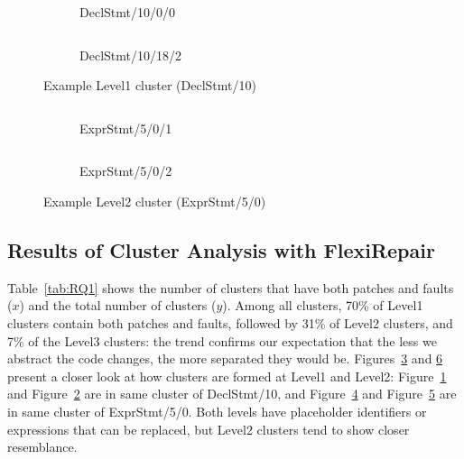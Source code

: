 \documentclass[conference]{IEEEtran}
\begin{document}
\begin{figure}[!ht]
    \begin{subfigure}{\linewidth}
        \centering
        \inputminted[escapeinside=||]{diff}{figures/diff/level1_a.diff}
        \caption{DeclStmt/10/0/0}
        \label{fig:RQ1_example_level1_a}
    \end{subfigure}
    \begin{subfigure}{\linewidth}
        \centering
        \inputminted[escapeinside=||]{diff}{figures/diff/level1_b.diff}
        \caption{DeclStmt/10/18/2}
        \label{fig:RQ1_example_level1_b}
    \end{subfigure}

    \caption{Example Level1 cluster (DeclStmt/10)}
    \label{fig:RQ1_example_level1}
\end{figure}

\begin{figure}[!ht]
    \begin{subfigure}{\linewidth}
        \centering
        \inputminted[escapeinside=||]{diff}{figures/diff/level2_a.diff}
        \caption{ExprStmt/5/0/1}
        \label{fig:RQ1_example_level2_a}
    \end{subfigure}
    \begin{subfigure}{\linewidth}
        \centering
        \inputminted[escapeinside=||]{diff}{figures/diff/level2_b.diff}
        \caption{ExprStmt/5/0/2}
        \label{fig:RQ1_example_level2_b}
    \end{subfigure}

    \caption{Example Level2 cluster (ExprStmt/5/0)}
    \label{fig:RQ1_example_level2}
\end{figure}


\subsection{Results of Cluster Analysis with FlexiRepair}
\label{sec:RQ1_results_1}

Table~\ref{tab:RQ1} shows the number of clusters that have both patches and 
faults ($x$) and the total number of clusters ($y$). Among all clusters, 70\% 
of Level1 clusters contain both patches and faults, followed by 31\% of Level2 
clusters, and 7\% of the Level3 clusters: the trend confirms our expectation 
that the less we abstract the code changes, the more separated they would be.
Figures~\ref{fig:RQ1_example_level1} and \ref{fig:RQ1_example_level2}
present a closer look at how clusters are formed at Level1 and Level2:
Figure~\ref{fig:RQ1_example_level1_a} and Figure~\ref{fig:RQ1_example_level1_b} 
are in same cluster of DeclStmt/10, and Figure~\ref{fig:RQ1_example_level2_a} 
and Figure~\ref{fig:RQ1_example_level2_b} are in same cluster of ExprStmt/5/0.
Both levels have placeholder identifiers or expressions that can be replaced,
but Level2 clusters tend to show closer resemblance.
\end{document}
